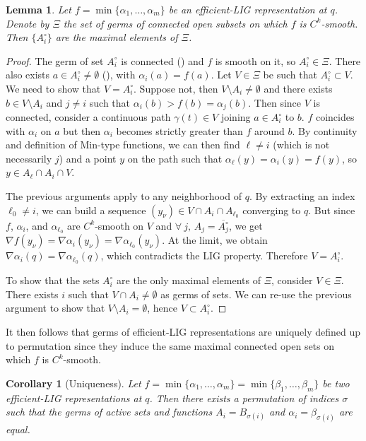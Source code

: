 \documentclass[11pt]{article}
\newcommand{\inter}{\cap}
\newcommand{\grad}{\nabla}
\theoremstyle{plain}
\newtheorem{lem}{Lemma}
\newtheorem{cor}{Corollary}
\theoremstyle{definition}
\theoremstyle{remark}
\begin{document}
	\begin{lem}
		\label{lem:active_sets_maximal}
		Let $f = \min \{\alpha_1,\ldots,\alpha_m\}$ be an efficient-LIG representation at $q$. Denote by $\Xi$ the set of germs of connected open subsets on which $f$ is $C^k$-smooth.
		Then $\{A_i^\circ\}$ are the maximal elements of $\Xi$.
	\end{lem}
	\begin{proof}
		The germ of set $A_i^\circ$ is connected () and $f$ is smooth on it, so $A_i^\circ \in \Xi$. There also exists $a \in A_i^\circ \neq \emptyset$ (), with $\alpha_i(a) = f(a)$.
		Let $V \in \Xi$ be such that $A_i^\circ \subset V$. We need to show that $V = A_i^\circ$.  Suppose not, then $V \setminus A_i \neq \emptyset$ and there exists $b \in V \setminus A_i$ and $j \neq i$ such that $\alpha_i(b) > f(b) = \alpha_j(b)$.
		Then since $V$ is connected, consider a continuous path $\gamma(t) \in V$ joining $a \in A_i^\circ$ to $b$. $f$ coincides with $\alpha_i$ on $a$ but then $\alpha_i$ becomes strictly greater than $f$ around $b$. By continuity and definition of Min-type functions, we can then find $\ell \neq i$ (which is not necessarily $j$) and a point $y$ on the path such that $\alpha_\ell(y) = \alpha_i(y) = f(y)$, so $y \in A_\ell \inter A_i \inter V$.
		
		The previous arguments apply to any neighborhood of $q$. By extracting an index $\ell_0 \neq i$, we can build a sequence $(y_\nu) \in V \inter A_i \inter A_{\ell_0}$ converging to $q$. But since $f$, $\alpha_i$, and $\alpha_{\ell_0}$ are $C^k$-smooth on $V$ and $\forall\ j,\, A_j = \overline{A_j^\circ}$, we get $\grad f(y_\nu) = \grad \alpha_i(y_\nu) = \grad \alpha_{\ell_0}(y_\nu)$. At the limit, we obtain $\grad \alpha_i(q) = \grad \alpha_{\ell_0}(q)$, which contradicts the LIG property. Therefore $V = A_i^\circ$.
		
		To show that the sets $A_i^\circ$ are the only maximal elements of $\Xi$, consider $V \in \Xi$. There exists $i$ such that $V \inter A_i \neq \emptyset$ as germs of sets. We can re-use the previous argument to show that $V \setminus A_i = \emptyset$, hence $V \subset A_i^\circ$.
	\end{proof}
	
	It then follows that germs of efficient-LIG representations are uniquely defined up to permutation since they induce the same maximal connected open sets on which $f$ is $C^k$-smooth.
	\begin{cor}[Uniqueness]
		\label{cor:uniqueness_minirep}
		Let $f = \min \{\alpha_1,\ldots,\alpha_m\} = \min \{\beta_1,\ldots,\beta_m\}$ be two efficient-LIG representations at $q$. Then there exists a permutation of indices $\sigma$ such that the germs of active sets and functions $A_i = B_{\sigma(i)}$ and $\alpha_i = \beta_{\sigma(i)}$ are equal.
	\end{cor}
	
\end{document}
